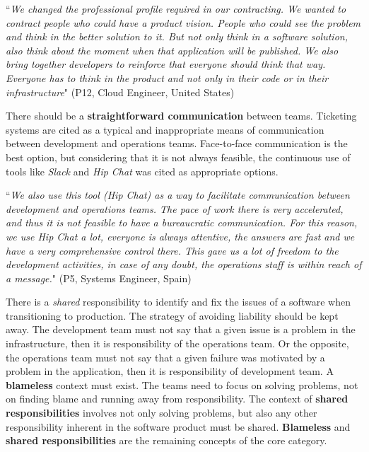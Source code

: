 \begin{mq}
``\emph{We changed the professional profile required in our contracting. We wanted to
contract people who could have a product vision. People who could see the
problem and think in the better solution to it. But not only think in a
software solution, also think about the moment when that application will be
published. We also bring together developers to reinforce that everyone
should think that way. Everyone has to think in the product and not only in
their code or in their infrastructure}" (P12, Cloud Engineer, United States)
\end{mq}

There should be a \textbf{straightforward communication} between teams. Ticketing
systems are cited as a typical and inappropriate means of communication
between development and operations teams. Face-to-face communication is the best
option, but considering that it is not always feasible, the continuous use of
tools like \emph{Slack} and \emph{Hip Chat} was cited as appropriate options.

\begin{mq}
``\emph{We also use this tool (Hip Chat) as a way to facilitate communication between
development and operations teams. The pace of work there is very accelerated, and thus
it is not feasible to have a bureaucratic communication. For this reason, we use Hip Chat
a lot, everyone is always attentive, the answers are fast and we have a very
comprehensive control there. This gave us a lot of freedom to the development
activities, in case of any doubt, the operations staff is within reach of a
message.}" (P5, Systems Engineer, Spain)
\end{mq}

There is a \emph{shared} responsibility to identify and fix the issues 
of a software when transitioning to production. The strategy of avoiding liability should be kept away.
The development team must not say that a given issue is a problem in the infrastructure, then
it is responsibility of the operations team. Or the opposite, the operations team
must not say that a given failure was motivated by a problem in the application, then it is
responsibility of development team. A \textbf{blameless} context must exist.
The teams need to focus on solving problems, not on finding blame and
running away from responsibility. The context of \textbf{shared
responsibilities} involves not only solving problems, but also any other
responsibility inherent in the software product must be shared.
\textbf{Blameless} and \textbf{shared responsibilities} are the remaining
concepts of the core category.

